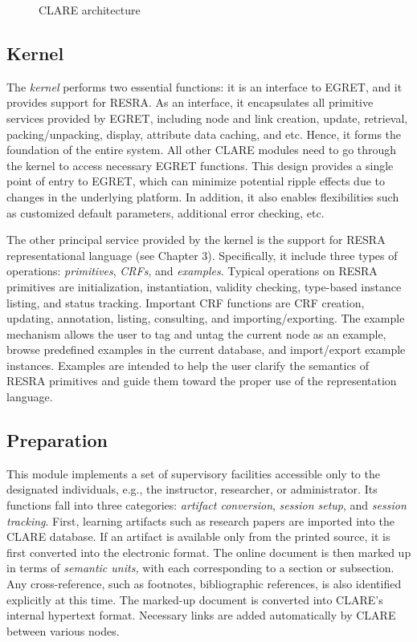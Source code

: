\begin{figure}[htb]
  \caption{CLARE architecture}
  \label{fig:arch}
\end{figure}


\subsection{Kernel}
\label{sec:kernel}

The {\it kernel\/} performs two essential functions: it is an interface to
EGRET, and it provides support for RESRA. As an interface, it encapsulates
all primitive services provided by EGRET, including node and link creation,
update, retrieval, packing/unpacking, display, attribute data caching, and
etc. Hence, it forms the foundation of the entire system. All other CLARE
modules need to go through the kernel to access necessary EGRET
functions. This design provides a single point of entry to EGRET, which can
minimize potential ripple effects due to changes in the underlying
platform. In addition, it also enables flexibilities such as customized
default parameters, additional error checking, etc.

The other principal service provided by the kernel is the support for RESRA
representational language (see Chapter 3).  Specifically, it include three
types of operations: {\it primitives\/}, {\it CRFs\/}, and {\it
examples\/}. Typical operations on RESRA primitives are initialization,
instantiation, validity checking, type-based instance listing, and status
tracking. Important CRF functions are CRF creation, updating, annotation,
listing, consulting, and importing/exporting. The example mechanism allows
the user to tag and untag the current node as an example, browse predefined
examples in the current database, and import/export example
instances. Examples are intended to help the user clarify the semantics of
RESRA primitives and guide them toward the proper use of the representation
language.


\subsection{Preparation}

This module implements a set of supervisory facilities accessible only to
the designated individuals, e.g., the instructor, researcher, or
administrator. Its functions fall into three categories: {\it artifact
conversion\/}, {\it session setup\/}, and {\it session tracking\/}. First,
learning artifacts such as research papers are imported into the CLARE
database. If an artifact is available only from the printed source, it is
first converted into the electronic format. The online document is then
marked up in terms of {\it semantic units,\/} with each corresponding to a
section or subsection. Any cross-reference, such as footnotes,
bibliographic references, is also identified explicitly at this time. The
marked-up document is converted into CLARE's internal hypertext format.
Necessary links are added automatically by CLARE  between various nodes.

